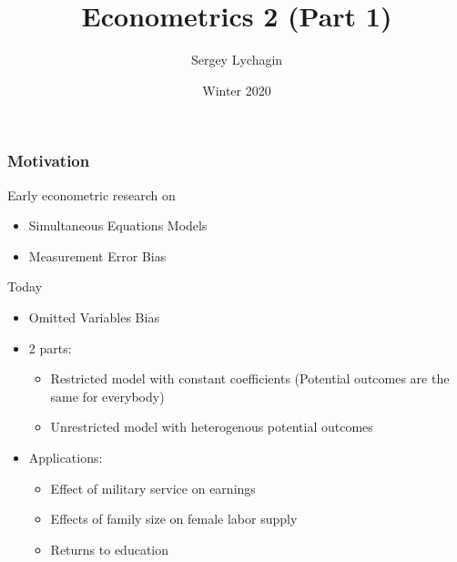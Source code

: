 \documentclass[pdftex]{beamer}
\title[Instrumental Variables]{Econometrics 2 (Part 1)}
\author[Lychagin  \& Mu\c co]{Sergey Lychagin}
\institute[CEU]{Central European University}
\date{Winter 2020}
\begin{document}
\frame{\titlepage}



\begin{frame}
\frametitle{Motivation}
Early econometric research on 
\begin{itemize}
\item Simultaneous Equations Models
\item Measurement Error Bias
\end{itemize}
Today
\begin{itemize}
\item Omitted Variables Bias
\end{itemize}
\begin{itemize}

\item 2 parts:
      \begin{itemize}
         \item Restricted model with constant coefficients (Potential outcomes are the same for everybody)\\
         \item Unrestricted model with heterogenous potential outcomes
      \end{itemize}
\item Applications:
         \begin{itemize}
           \item Effect of military service on earnings
           \item Effects of family size on female labor supply
           \item Returns to education
         \end{itemize}

\end{itemize}
\end{frame}


\end{document}
